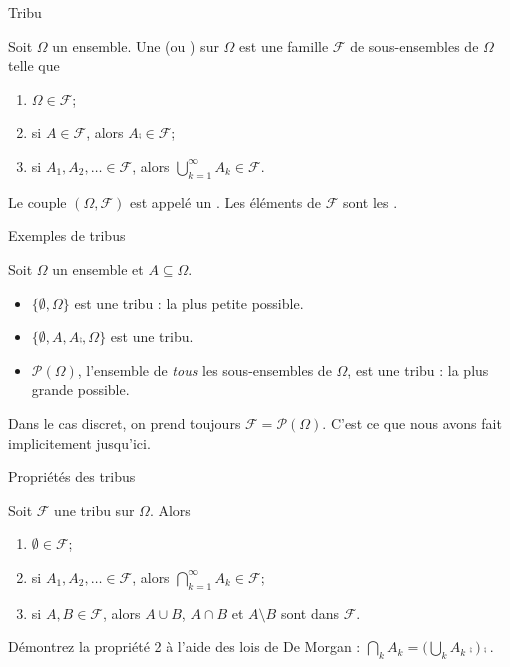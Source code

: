 \documentclass[nuit,charter,pied]{BeamerJS}
\newcommand{\tribu}{\mathcal{F}}
\begin{document}
\begin{frame}[t]{Tribu}
\pause
	\begin{defn}
		Soit \(\Omega\) un ensemble. Une  (ou ) sur \(\Omega\) est une famille \(\tribu\) de sous-ensembles de \(\Omega\) telle que\pause
		\begin{enumerate}
			\item \(\Omega\in\tribu\);\pause
			\item si \(A\in\tribu\), alors \(A\comp\in\tribu\);\pause
			\item si \(A_1,A_2,\ldots\in\tribu\), alors \(\displaystyle\bigcup_{k=1}^{\infty}A_k\in\tribu\).
		\end{enumerate}
	\end{defn}
	\pause
	Le couple \((\Omega,\tribu)\) est appelé un . Les éléments de \(\tribu\) sont les .
\end{frame}

\begin{frame}{Exemples de tribus}
\pause
	\begin{exs}
		Soit \(\Omega\) un ensemble et \(A\subseteq\Omega\).
		\begin{itemize}
			\item \(\{\emptyset,\Omega\}\) est une tribu : la plus petite possible.\pause
			\item \(\{\emptyset,A,A\comp,\Omega\}\) est une tribu.\pause
			\item \(\mathcal{P}(\Omega)\), l'ensemble de \emph{tous} les sous-ensembles de \(\Omega\), est une tribu : la plus grande possible.
		\end{itemize}
	\end{exs}
	\pause
	\begin{lumiere}
		Dans le cas discret, on prend toujours \(\tribu=\mathcal{P}(\Omega)\). C'est ce que nous avons fait implicitement jusqu'ici.
	\end{lumiere}
\end{frame}

\begin{frame}[t]{Propriétés des tribus}
\pause
	\begin{prop}
		Soit \(\tribu\) une tribu sur \(\Omega\). Alors
		\begin{enumerate}
			\item \(\emptyset\in\tribu\);\pause
			\item si \(A_1,A_2,\ldots\in\tribu\), alors \(\displaystyle\bigcap_{k=1}^{\infty}A_k\in\tribu\);\pause
			\item si \(A,B\in\tribu\), alors \(A\cup B\), \(A\cap B\) et \(A\setminus B\) sont dans \(\tribu\).
		\end{enumerate}
	\end{prop}
	\pause
	\begin{cadre}
		Démontrez la propriété 2 à l'aide des lois de De Morgan : \(\bigcap_{k}A_k=\bigl(\bigcup_{k}A_k\comp\bigr)\comp\).
	\end{cadre}
\end{frame}
\end{document}
